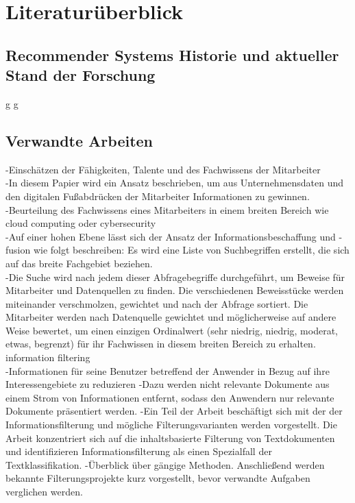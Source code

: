 \chapter{Literaturüberblick}
\label{chap:literaturüberblick}

\section{Recommender Systems Historie und aktueller Stand der Forschung}
\cite{dong2022brief}
\cite{burke2011recommender}

\cite{chartron2014general}

\cite{ricci2014recommender}

\cite{lu2020recommender}

g
\newpage
g
\newpage

\section{Verwandte Arbeiten}

-Einschätzen der Fähigkeiten, Talente und des Fachwissens der Mitarbeiter\\
-In diesem Papier wird ein Ansatz beschrieben, um aus Unternehmensdaten und den digitalen Fußabdrücken der Mitarbeiter Informationen zu gewinnen.\\
-Beurteilung des Fachwissens eines Mitarbeiters in einem breiten Bereich wie cloud computing oder cybersecurity\\
-Auf einer hohen Ebene lässt sich der Ansatz der Informationsbeschaffung und -fusion wie folgt beschreiben: Es wird eine Liste von Suchbegriffen erstellt, die sich auf das breite Fachgebiet beziehen.\\
-Die Suche wird nach jedem dieser Abfragebegriffe durchgeführt, um Beweise für Mitarbeiter und Datenquellen zu finden. Die verschiedenen Beweisstücke werden miteinander verschmolzen, gewichtet und nach der Abfrage sortiert. Die Mitarbeiter werden nach Datenquelle gewichtet und möglicherweise auf andere Weise bewertet, um einen einzigen Ordinalwert (sehr niedrig, niedrig, moderat, etwas, begrenzt) für ihr Fachwissen in diesem breiten Bereich zu erhalten.\cite{horesh2016information} \\

information filtering\\
-Informationen für seine Benutzer betreffend der Anwender in Bezug auf ihre Interessengebiete zu reduzieren
-Dazu werden nicht relevante Dokumente aus einem Strom von Informationen entfernt, sodass den Anwendern nur relevante Dokumente präsentiert werden.
-Ein Teil der Arbeit beschäftigt sich mit der der Informationsfilterung und mögliche Filterungsvarianten werden vorgestellt. Die Arbeit konzentriert sich auf die inhaltsbasierte Filterung von Textdokumenten und identifizieren Informationsfilterung als einen Spezialfall der Textklassifikation.
-Überblick über gängige Methoden. Anschließend werden bekannte Filterungsprojekte kurz vorgestellt, bevor verwandte Aufgaben verglichen werden.
\cite{lanquillon2001enhancing}

